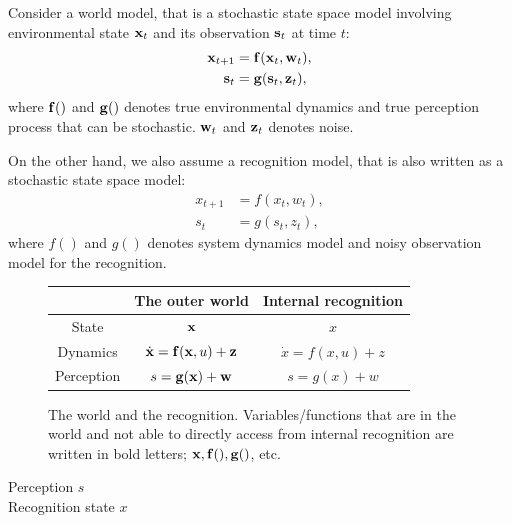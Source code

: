 \documentclass{article}
\begin{document}
Consider a world model, that is a stochastic state space model involving environmental state ${\bf x}_t$ and its observation ${\bf s}_t$ at time $t$:
\begin{align}
{\bf x}_{t+1} &= {\bf f}({\bf x}_t, {\bf w}_t),\\
{\bf s}_{t} &= {\bf g}({\bf s}_t, {\bf z}_t),
\end{align}
where ${\bf f}()$ and ${\bf g}()$ denotes true environmental dynamics and true perception process that can be stochastic. 
${\bf w}_t$ and ${\bf z}_t$ denotes noise.

On the other hand, we also assume a recognition model, that is also written as a stochastic state space model:
\begin{align}
{x}_{t+1} &= {f}({x}_t, {w}_t),\\
{s}_{t} &= {g}({s}_t, {z}_t),
\end{align}
where $f()$ and $g()$ denotes system dynamics model and noisy observation model for the recognition.

\begin{figure}[hb]
\begin{center}
\begin{tabular}{c|c|c}
& The outer world & Internal recognition \\
\hline
State & ${\bf x}$ & $x$\\
Dynamics & $\dot{\bf x}={\bf f}({\bf x},u)+{\bf z} $ & $\dot{x}=f(x,u)+z $\\
Perception & $s={\bf g}({\bf x})+{\bf w}$ & $s=g(x)+w$ \\
\end{tabular}
\end{center}
\caption{The world and the recognition. Variables/functions that are in the world and not able to directly access from internal recognition are written in bold letters; ${\bf x}, {\bf f}(), {\bf g}()$, etc.}
\end{figure}
Perception $s$\\
Recognition state $x$
\end{document}
